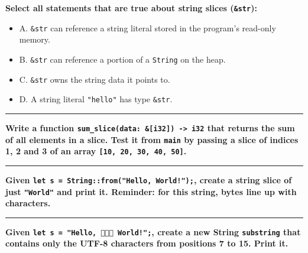 \documentclass[
  11pt,
]{article}
\newenvironment{Shaded}{}{}
\providecommand{\tightlist}{%
  \setlength{\itemsep}{0pt}\setlength{\parskip}{0pt}}
\begin{document}
\textbf{Select all statements that are true about string slices
(\texttt{\&str}):}

\begin{itemize}
\tightlist
\item[$\square$]
  A. \texttt{\&str} can reference a string literal stored in the
  program's read-only memory.
\item[$\square$]
  B. \texttt{\&str} can reference a portion of a \texttt{String} on the
  heap.
\item[$\square$]
  C. \texttt{\&str} owns the string data it points to.
\item[$\square$]
  D. A string literal \texttt{"hello"} has type \texttt{\&str}.
\end{itemize}

\begin{center}\rule{0.5\linewidth}{0.5pt}\end{center}

\textbf{Write a function
\texttt{sum\_slice(data:\ \&{[}i32{]})\ -\textgreater{}\ i32} that
returns the sum of all elements in a slice. Test it from \texttt{main}
by passing a slice of indices 1, 2 and 3 of an array
\texttt{{[}10,\ 20,\ 30,\ 40,\ 50{]}}.}

\begin{Shaded}
\begin{Highlighting}[]

\end{Highlighting}
\end{Shaded}

\begin{center}\rule{0.5\linewidth}{0.5pt}\end{center}

\textbf{Given \texttt{let\ s\ =\ String::from("Hello,\ World!");},
create a string slice of just \texttt{"World"} and print it. Reminder:
for this string, bytes line up with characters.}

\begin{Shaded}
\begin{Highlighting}[]

\end{Highlighting}
\end{Shaded}

\begin{center}\rule{0.5\linewidth}{0.5pt}\end{center}

\textbf{Given \texttt{let\ s\ =\ "Hello,\ 👋👋👋\ World!";}, create a
new String \texttt{substring} that contains only the UTF-8 characters
from positions 7 to 15. Print it.}
\end{document}
